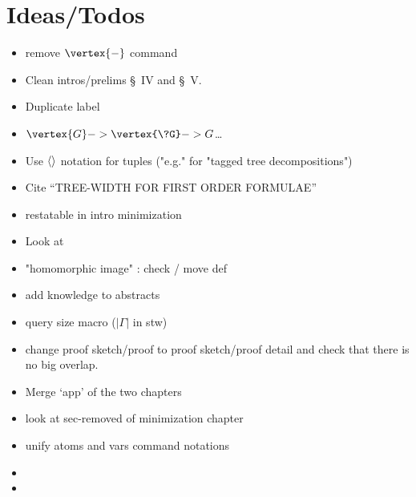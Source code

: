 \chapter*{Ideas/Todos}


\begin{itemize}
	\item remove $\vertex{-}$ command
	\item Clean intros/prelims \S~IV and \S~V.
	\item Duplicate label
	\item $\vertex{G} -> \vertex{\?G} -> G$…
	\item Use $\langle\rangle$ notation for tuples ("e.g." for "tagged tree decompositions")
	\item Cite ``TREE-WIDTH FOR FIRST ORDER FORMULAE''
	\item restatable in intro minimization
	\item Look at \cite{ChenGottlobLanzingerPichler2020Semantic}
	\item "homomorphic image" : check / move def
	\item add knowledge to abstracts
	\item query size macro ($|\Gamma|$ in stw)
	\item change proof sketch/proof to proof sketch/proof detail and check
		that there is no big overlap.
	\item Merge `app' of the two chapters
	\item look at sec-removed of minimization chapter
	\item unify atoms and vars command notations
	\item {}
	\item {}

\end{itemize}
